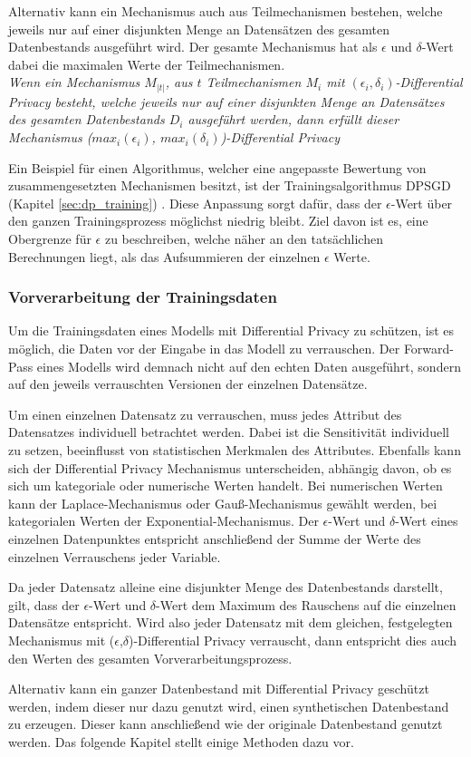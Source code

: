 Alternativ kann ein Mechanismus auch aus Teilmechanismen bestehen, welche jeweils nur auf einer disjunkten Menge an Datensätzen des gesamten Datenbestands ausgeführt wird.
Der gesamte Mechanismus hat als $\epsilon$ und $\delta$-Wert dabei die maximalen Werte der Teilmechanismen.\\
\textit{
    Wenn ein Mechanismus $M_{|t|}$, aus $t$ Teilmechanismen $M_i$ mit $(\epsilon_i,\delta_i)$-Differential Privacy besteht, welche jeweils 
    nur auf einer disjunkten Menge an Datensätzes des gesamten Datenbestands $D_i$ ausgeführt werden, 
    dann erfüllt dieser Mechanismus ($max_i(\epsilon_{i})$, $max_i(\delta_{i})$)-Differential Privacy
}


Ein Beispiel für einen Algorithmus, welcher eine angepasste Bewertung von zusammengesetzten Mechanismen besitzt, ist der Trainingsalgorithmus DPSGD (Kapitel \ref{sec:dp_training}) \cite{P-28}.
Diese Anpassung sorgt dafür, dass der $\epsilon$-Wert über den ganzen Trainingsprozess möglichst niedrig bleibt.
Ziel davon ist es, eine Obergrenze für $\epsilon$ zu beschreiben, welche näher an den tatsächlichen Berechnungen liegt, als das Aufsummieren der einzelnen $\epsilon$ Werte.


\subsubsection*{Vorverarbeitung der Trainingsdaten}
Um die Trainingsdaten eines Modells mit Differential Privacy zu schützen, ist es möglich, die Daten vor der Eingabe in das Modell zu verrauschen.
Der Forward-Pass eines Modells wird demnach nicht auf den echten Daten ausgeführt, sondern auf den jeweils verrauschten Versionen der einzelnen Datensätze.

Um einen einzelnen Datensatz zu verrauschen, muss jedes Attribut des Datensatzes individuell betrachtet werden. 
Dabei ist die Sensitivität individuell zu setzen, beeinflusst von statistischen Merkmalen des Attributes.
Ebenfalls kann sich der Differential Privacy Mechanismus unterscheiden, abhängig davon, ob es sich um kategoriale oder numerische Werten handelt.
Bei numerischen Werten kann der Laplace-Mechanismus oder Gauß-Mechanismus gewählt werden, bei kategorialen Werten der Exponential-Mechanismus.
Der $\epsilon$-Wert und $\delta$-Wert eines einzelnen Datenpunktes entspricht anschließend der Summe der Werte des einzelnen Verrauschens jeder Variable.

Da jeder Datensatz alleine eine disjunkter Menge des Datenbestands darstellt, gilt, dass der $\epsilon$-Wert und $\delta$-Wert dem Maximum des Rauschens auf die einzelnen Datensätze entspricht.
Wird also jeder Datensatz mit dem gleichen, festgelegten Mechanismus mit ($\epsilon$,$\delta$)-Differential Privacy verrauscht, dann entspricht dies auch den Werten des gesamten Vorverarbeitungsprozess.

Alternativ kann ein ganzer Datenbestand mit Differential Privacy geschützt werden, indem dieser nur dazu genutzt wird, einen synthetischen Datenbestand zu erzeugen.
Dieser kann anschließend wie der originale Datenbestand genutzt werden.
Das folgende Kapitel stellt einige Methoden dazu vor.

